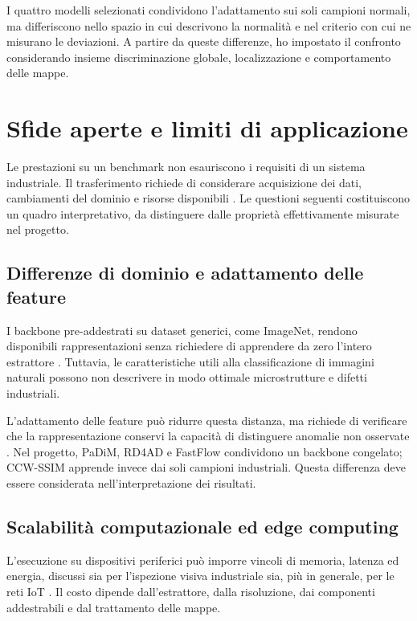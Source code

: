 I quattro modelli selezionati condividono l'adattamento sui soli campioni normali, ma differiscono nello spazio in cui descrivono la normalità e nel criterio con cui ne misurano le deviazioni. A partire da queste differenze, ho impostato il confronto considerando insieme discriminazione globale, localizzazione e comportamento delle mappe.

\section{Sfide aperte e limiti di applicazione}

Le prestazioni su un benchmark non esauriscono i requisiti di un sistema industriale. Il trasferimento richiede di considerare acquisizione dei dati, cambiamenti del dominio e risorse disponibili \cite{Alzarooni_et_al._2024,Li_et_al._2025}. Le questioni seguenti costituiscono un quadro interpretativo, da distinguere dalle proprietà effettivamente misurate nel progetto.

\subsection{Differenze di dominio e adattamento delle feature}

I backbone pre-addestrati su dataset generici, come ImageNet, rendono disponibili rappresentazioni senza richiedere di apprendere da zero l'intero estrattore \cite{Roth_et_al._2022}. Tuttavia, le caratteristiche utili alla classificazione di immagini naturali possono non descrivere in modo ottimale microstrutture e difetti industriali.

L'adattamento delle feature può ridurre questa distanza, ma richiede di verificare che la rappresentazione conservi la capacità di distinguere anomalie non osservate \cite{Li_et_al._2025}. Nel progetto, PaDiM, RD4AD e FastFlow condividono un backbone congelato; CCW-SSIM apprende invece dai soli campioni industriali. Questa differenza deve essere considerata nell'interpretazione dei risultati.

\subsection{Scalabilità computazionale ed edge computing}

L'esecuzione su dispositivi periferici può imporre vincoli di memoria, latenza ed energia, discussi sia per l'ispezione visiva industriale sia, più in generale, per le reti IoT \cite{Li_et_al._2025,Morshedi_et_al._2025}. Il costo dipende dall'estrattore, dalla risoluzione, dai componenti addestrabili e dal trattamento delle mappe.

